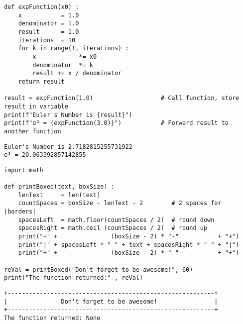 \begin{frame}[fragile]
%
\vspace{-5pt}
\begin{codebox}
\begin{verbatim}
def expFunction(x0) :
    x           = 1.0
    denominator = 1.0
    result      = 1.0
    iterations  = 10
    for k in range(1, iterations) :
        x            *= x0
        denominator  *= k
        result += x / denominator
    return result

result = expFunction(1.0)                   # Call function, store result in variable
print(f"Euler's Number is {result}")
print(f"e³ = {expFunction(3.0)}")           # Forward result to another function
\end{verbatim}
\end{codebox}

\begin{cmdbox}
\begin{verbatim}
Euler's Number is 2.7182815255731922
e³ = 20.063392857142855
\end{verbatim}
\end{cmdbox}
%
\end{frame}


\begin{frame}[fragile]
%
\vspace{-7pt}
\begin{codebox}
\begin{verbatim}
import math

def printBoxed(text, boxSize) :
    lenText     = len(text)
    countSpaces = boxSize - lenText - 2        # 2 spaces for |borders|
    spacesLeft  = math.floor(countSpaces / 2)  # round down
    spacesRight = math.ceil (countSpaces / 2)  # round up
    print("+" +               (boxSize - 2) * "-"           + "+")
    print("|" + spacesLeft * " " + text + spacesRight * " " + "|")
    print("+" +               (boxSize - 2) * "-"           + "+")

reVal = printBoxed("Don't forget to be awesome!", 60)
print("The function returned:" , reVal)
\end{verbatim}
\end{codebox}

\vspace{-12pt}
\begin{cmdbox}
\begin{verbatim}
+----------------------------------------------------------+
|               Don't forget to be awesome!                |
+----------------------------------------------------------+
The function returned: None
\end{verbatim}
\end{cmdbox}
%
\end{frame}

